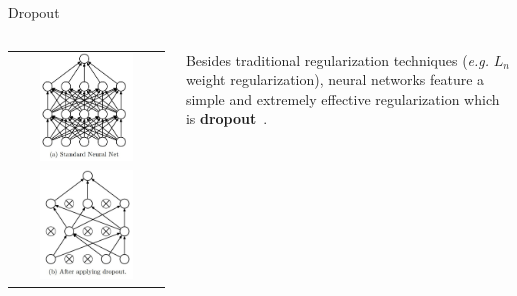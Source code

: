 \documentclass[aspectratio=169]{beamer}
\begin{document}
\begin{frame}{Dropout}
\vspace{0.5cm}
\begin{columns}
\begin{column}{0.3\textwidth}
\begin{tabular}{c}
\includegraphics[width=0.65\textwidth]{img/dnn/dropout_no.jpg}\\
\includegraphics[width=0.65\textwidth]{img/dnn/dropout_yes.jpg}
\end{tabular}
\end{column}
\begin{column}{0.7\textwidth}
Besides traditional regularization techniques (\emph{e.g.} $L_n$ weight regularization), neural networks feature a simple and extremely effective regularization which is  \textbf{dropout}~\cite{srivastava2014dropout}.\\

\end{column}
\end{columns}
\end{frame}
\end{document}
